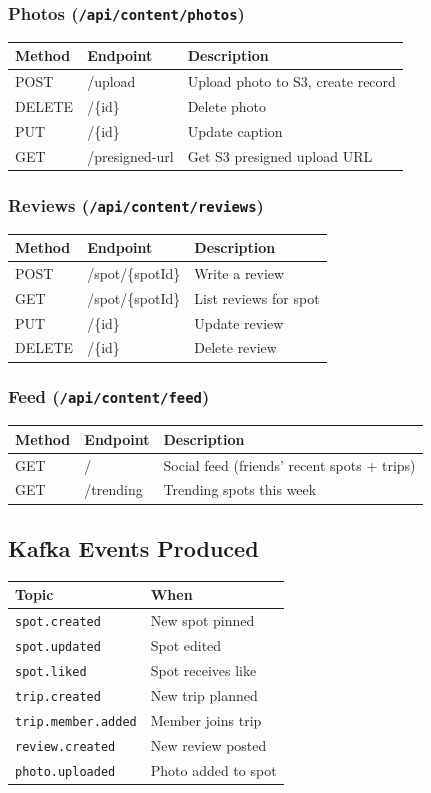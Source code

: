 \documentclass[12pt,letterpaper]{article}
\begin{document}
\subsubsection{Photos (\texttt{/api/content/photos})}
\begin{tabular}{|l|l|l|}
\hline
\textbf{Method} & \textbf{Endpoint} & \textbf{Description} \\
\hline
POST   & /upload & Upload photo to S3, create record \\
DELETE & /\{id\} & Delete photo \\
PUT    & /\{id\} & Update caption \\
GET    & /presigned-url & Get S3 presigned upload URL \\
\hline
\end{tabular}

\subsubsection{Reviews (\texttt{/api/content/reviews})}
\begin{tabular}{|l|l|l|}
\hline
\textbf{Method} & \textbf{Endpoint} & \textbf{Description} \\
\hline
POST & /spot/\{spotId\} & Write a review \\
GET  & /spot/\{spotId\} & List reviews for spot \\
PUT  & /\{id\} & Update review \\
DELETE & /\{id\} & Delete review \\
\hline
\end{tabular}

\subsubsection{Feed (\texttt{/api/content/feed})}
\begin{tabular}{|l|l|l|}
\hline
\textbf{Method} & \textbf{Endpoint} & \textbf{Description} \\
\hline
GET & / & Social feed (friends' recent spots + trips) \\
GET & /trending & Trending spots this week \\
\hline
\end{tabular}

\subsection{Kafka Events Produced}
\begin{tabular}{|l|l|}
\hline
\textbf{Topic} & \textbf{When} \\
\hline
\texttt{spot.created} & New spot pinned \\
\texttt{spot.updated} & Spot edited \\
\texttt{spot.liked} & Spot receives like \\
\texttt{trip.created} & New trip planned \\
\texttt{trip.member.added} & Member joins trip \\
\texttt{review.created} & New review posted \\
\texttt{photo.uploaded} & Photo added to spot \\
\hline
\end{tabular}
\end{document}
